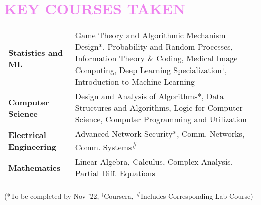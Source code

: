 \documentclass[a4paper,11pt]{article}
\begin{document}
\section{\textcolor{Violet}{\textbf{\Large{K}\large{EY}\Large{ C}\large{OURSES} \Large{T}\large{AKEN}}}}
\vspace{-5pt}
\hspace{-5pt}
\begin{tabular}{p{45mm} p{13cm}}
    \vspace{-9pt}\textbf{Statistics and ML} & \vspace{-10pt}Game Theory and Algorithmic Mechanism Design*, Probability and Random Processes, Information Theory \& Coding, Medical Image Computing, Deep Learning Specialization\textsuperscript{$\dagger$}, Introduction to Machine Learning \\
    
    \vspace{-5pt}\textbf{Computer Science} & \vspace{-5pt}Design and Analysis of Algorithms*, Data Structures and Algorithms, Logic for Computer Science, Computer Programming and Utilization \\

    \vspace{-5pt}\textbf{Electrical Engineering} & \vspace{-5pt}Advanced Network Security*, Comm. Networks, Comm. Systems\textsuperscript{\#}\\
    
    \vspace{-5pt}\textbf{Mathematics} & \vspace{-5pt} Linear Algebra, Calculus, Complex Analysis, Partial Diff. Equations 
\end{tabular}

\hfill {\footnotesize (*To be completed by Nov-'22, $^{\dagger}$Coursera, \textsuperscript{\#}Includes Corresponding Lab Course)}
\vspace{-2mm}
\end{document}
